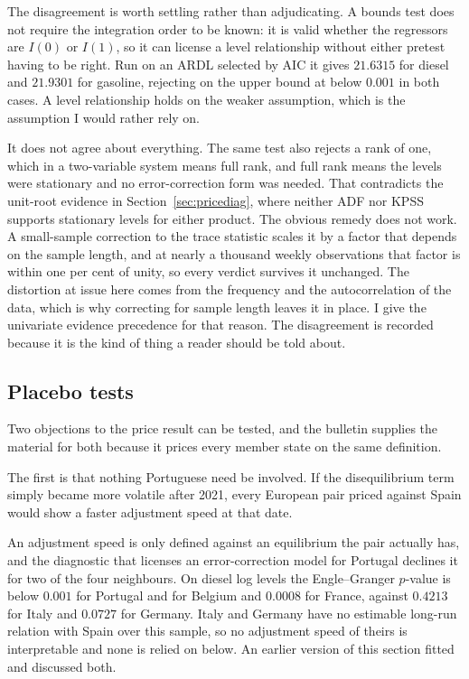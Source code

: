 \documentclass[11pt,a4paper]{article}
\begin{document}
The disagreement is worth settling rather than adjudicating. A bounds test does not
require the integration order to be known: it is valid whether the regressors are $I(0)$ or
$I(1)$, so it can license a level relationship without either pretest having to be right.
Run on an ARDL selected by AIC it gives $21.6315$ for diesel and $21.9301$ for gasoline,
rejecting on the upper bound at below $0.001$ in both cases. A level relationship holds on
the weaker assumption, which is the assumption I would rather rely on.

It does not agree about everything. The same test also rejects a rank of one, which in a two-variable
system means full rank, and full rank means the levels were stationary and no error-correction
form was needed. That contradicts the unit-root evidence in
Section~\ref{sec:pricediag}, where neither ADF nor KPSS supports stationary levels for either
product. The obvious remedy does not work. A small-sample correction to the trace statistic
scales it by a factor that depends on the sample length, and at nearly a thousand weekly
observations that factor is within one per cent of unity, so every verdict survives it
unchanged. The distortion at issue here comes from the frequency and the autocorrelation of the
data, which is why correcting for sample length leaves it in place. I give the univariate
evidence precedence for that reason. The disagreement is recorded because it is the kind of
thing a reader should be told about.

\subsection{Placebo tests}
\label{sec:placebo}

Two objections to the price result can be tested, and the bulletin supplies the material for
both because it prices every member state on the same definition.

The first is that nothing Portuguese need be involved. If the disequilibrium term simply became
more volatile after 2021, every European pair priced against Spain would show a faster
adjustment speed at that date.

An adjustment speed is only defined against an equilibrium the pair actually has, and the
diagnostic that licenses an error-correction model for Portugal declines it for two of the four
neighbours. On diesel log levels the Engle--Granger $p$-value is below $0.001$ for Portugal
and for Belgium and $0.0008$ for France, against $0.4213$ for Italy and $0.0727$ for
Germany. Italy and Germany have no estimable long-run relation with Spain over this sample, so
no adjustment speed of theirs is interpretable and none is relied on below. An earlier version
of this section fitted and discussed both.
\end{document}
